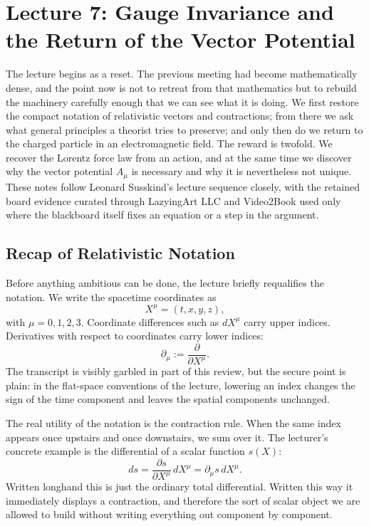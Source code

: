 \chapter{Lecture 7: Gauge Invariance and the Return of the Vector Potential}

The lecture begins as a reset. The previous meeting had become mathematically dense, and the point now is not to retreat from that mathematics but to rebuild the machinery carefully enough that we can see what it is doing. We first restore the compact notation of relativistic vectors and contractions; from there we ask what general principles a theorist tries to preserve; and only then do we return to the charged particle in an electromagnetic field. The reward is twofold. We recover the Lorentz force law from an action, and at the same time we discover why the vector potential \(A_\mu\) is necessary and why it is nevertheless not unique. These notes follow Leonard Susskind's lecture sequence closely, with the retained board evidence curated through LazyingArt LLC and Video2Book used only where the blackboard itself fixes an equation or a step in the argument.

\section{Recap of Relativistic Notation}

Before anything ambitious can be done, the lecture briefly requalifies the notation. We write the spacetime coordinates as
\begin{equation}
X^\mu=(t,x,y,z),
\end{equation}
with \(\mu=0,1,2,3\). Coordinate differences such as \(dX^\mu\) carry upper indices. Derivatives with respect to coordinates carry lower indices:
\begin{equation}
\partial_\mu := \frac{\partial}{\partial X^\mu}.
\end{equation}
The transcript is visibly garbled in part of this review, but the secure point is plain: in the flat-space conventions of the lecture, lowering an index changes the sign of the time component and leaves the spatial components unchanged.

The real utility of the notation is the contraction rule. When the same index appears once upstairs and once downstairs, we sum over it. The lecturer's concrete example is the differential of a scalar function \(s(X)\):
\begin{equation}
ds=\frac{\partial s}{\partial X^\mu}\,dX^\mu=\partial_\mu s\,dX^\mu.
\end{equation}
Written longhand this is just the ordinary total differential. Written this way it immediately displays a contraction, and therefore the sort of scalar object we are allowed to build without writing everything out component by component.

